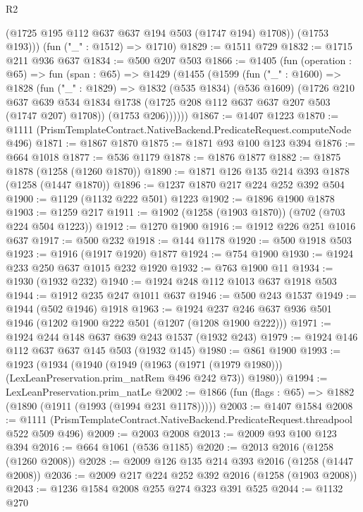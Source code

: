 \begin{lexlean}{R2}
\begin{coremodule}
          (@1725 @195 @112 @637 @637 @194 @503 (@1747 @194) @1708))
        (@1753 @193)))
    (fun ("_" : @1512) => @1710)
@1829 := @1511 @729
@1832 := @1715 @211 @936 @637
@1834 := @500 @207 @503
@1866 := @1405
    (fun (operation : @65) =>
    fun (span : @65) =>
    @1429
      (@1455
        (@1599
          (fun ("_" : @1600) =>
          @1828
            (fun ("_" : @1829) =>
            @1832
              (@535 @1834)
              (@536 @1609)
              (@1726
                @210
                @637
                @639
                @534
                @1834
                @1738
                (@1725 @208 @112 @637 @637 @207 @503 (@1747 @207) @1708))
              (@1753 @206))))))
@1867 := @1407 @1223
@1870 := @1111 (PrismTemplateContract.NativeBackend.PredicateRequest.computeNode @496)
@1871 := @1867 @1870
@1875 := @1871 @93 @100 @123 @394
@1876 := @664 @1018
@1877 := @536 @1179
@1878 := @1876 @1877
@1882 := @1875 @1878 (@1258 (@1260 @1870))
@1890 := @1871 @126 @135 @214 @393 @1878 (@1258 (@1447 @1870))
@1896 := @1237 @1870 @217 @224 @252 @392 @504
@1900 := @1129 (@1132 @222 @501) @1223
@1902 := @1896 @1900 @1878
@1903 := @1259 @217
@1911 := @1902 (@1258 (@1903 @1870)) (@702 (@703 @224 @504 @1223))
@1912 := @1270 @1900
@1916 := @1912 @226 @251 @1016 @637
@1917 := @500 @232
@1918 := @144 @1178
@1920 := @500 @1918 @503
@1923 := @1916 (@1917 @1920) @1877
@1924 := @754 @1900
@1930 := @1924 @233 @250 @637 @1015 @232 @1920
@1932 := @763 @1900 @11
@1934 := @1930 (@1932 @232)
@1940 := @1924 @248 @112 @1013 @637 @1918 @503
@1944 := @1912 @235 @247 @1011 @637
@1946 := @500 @243 @1537
@1949 := @1944 (@502 @1946) @1918
@1963 := @1924 @237 @246 @637 @936 @501 @1946 (@1202 @1900 @222 @501 (@1207 (@1208 @1900 @222)))
@1971 := @1924 @244 @148 @637 @639 @243 @1537 (@1932 @243)
@1979 := @1924 @146 @112 @637 @637 @145 @503 (@1932 @145)
@1980 := @861 @1900
@1993 := @1923
    (@1934
      (@1940
        (@1949 (@1963 (@1971 (@1979 @1980))) (LexLeanPreservation.prim_natRem @496 @242 @73))
        @1980))
@1994 := LexLeanPreservation.prim_natLe
@2002 := @1866 (fun (flags : @65) => @1882 (@1890 (@1911 (@1993 (@1994 @231 @1178)))))
@2003 := @1407 @1584
@2008 := @1111 (PrismTemplateContract.NativeBackend.PredicateRequest.threadpool @522 @509 @496)
@2009 := @2003 @2008
@2013 := @2009 @93 @100 @123 @394
@2016 := @664 @1061 (@536 @1185)
@2020 := @2013 @2016 (@1258 (@1260 @2008))
@2028 := @2009 @126 @135 @214 @393 @2016 (@1258 (@1447 @2008))
@2036 := @2009 @217 @224 @252 @392 @2016 (@1258 (@1903 @2008))
@2043 := @1236 @1584 @2008 @255 @274 @323 @391 @525
@2044 := @1132 @270

\end{coremodule}
\end{lexlean}
